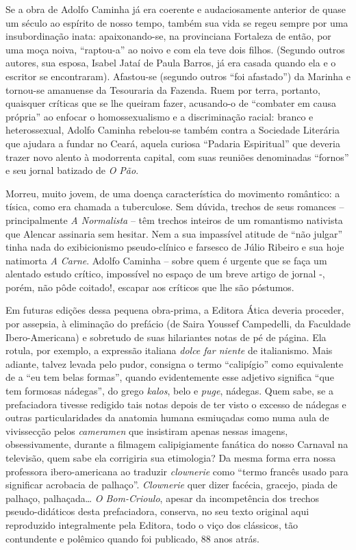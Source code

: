 \documentclass[
  letterpaper,
  DIV=11,
  numbers=noendperiod]{scrreprt}
\begin{document}
Se a obra de Adolfo Caminha já era coerente e audaciosamente anterior de
quase um século ao espírito de nosso tempo, também sua vida se regeu
sempre por uma insubordinação inata: apaixonando-se, na provinciana
Fortaleza de então, por uma moça noiva, ``raptou-a'' ao noivo e com ela
teve dois filhos. (Segundo outros autores, sua esposa, Isabel Jataí de
Paula Barros, já era casada quando ela e o escritor se encontraram).
Afastou-se (segundo outros ``foi afastado'') da Marinha e tornou-se
amanuense da Tesouraria da Fazenda. Ruem por terra, portanto, quaisquer
críticas que se lhe queiram fazer, acusando-o de ``combater em causa
própria'' ao enfocar o homossexualismo e a discriminação racial: branco
e heterossexual, Adolfo Caminha rebelou-se também contra a Sociedade
Literária que ajudara a fundar no Ceará, aquela curiosa ``Padaria
Espiritual'' que deveria trazer novo alento à modorrenta capital, com
suas reuniões denominadas ``fornos'' e seu jornal batizado de \emph{O
Pão}.

Morreu, muito jovem, de uma doença característica do movimento
romântico: a tísica, como era chamada a tuberculose. Sem dúvida, trechos
de seus romances -- principalmente \emph{A Normalista} -- têm trechos
inteiros de um romantismo nativista que Alencar assinaria sem hesitar.
Nem a sua impassível atitude de ``não julgar'' tinha nada do
exibicionismo pseudo-clínico e farsesco de Júlio Ribeiro e sua hoje
natimorta \emph{A Carne}. Adolfo Caminha -- sobre quem é urgente que se
faça um alentado estudo crítico, impossível no espaço de um breve artigo
de jornal -, porém, não pôde coitado!, escapar aos críticos que lhe são
póstumos.

Em futuras edições dessa pequena obra-prima, a Editora Ática deveria
proceder, por assepsia, à eliminação do prefácio (de Saira Youssef
Campedelli, da Faculdade Ibero-Americana) e sobretudo de suas
hilariantes notas de pé de página. Ela rotula, por exemplo, a expressão
italiana \emph{dolce far niente} de italianismo. Mais adiante, talvez
levada pelo pudor, consigna o termo ``calipígio'' como equivalente de a
``eu tem belas formas'', quando evidentemente esse adjetivo significa
``que tem formosas nádegas'', do grego \emph{kalos}, belo e \emph{puge},
nádegas. Quem sabe, se a prefaciadora tivesse redigido tais notas depois
de ter visto o excesso de nádegas e outras particularidades da anatomia
humana esmiuçadas como numa aula de vivissecção pelos \emph{cameramen}
que insistiram apenas nessas imagens, obsessivamente, durante a filmagem
calipigiamente fanática do nosso Carnaval na televisão, quem sabe ela
corrigiria sua etimologia? Da mesma forma erra nossa professora
ibero-americana ao traduzir \emph{clownerie} como ``termo francês usado
para significar acrobacia de palhaço''. \emph{Clownerie} quer dizer
facécia, gracejo, piada de palhaço, palhaçada\ldots{} \emph{O
Bom-Crioulo}, apesar da incompetência dos trechos pseudo-didáticos desta
prefaciadora, conserva, no seu texto original aqui reproduzido
integralmente pela Editora, todo o viço dos clássicos, tão contundente e
polêmico quando foi publicado, 88 anos atrás.
\end{document}

